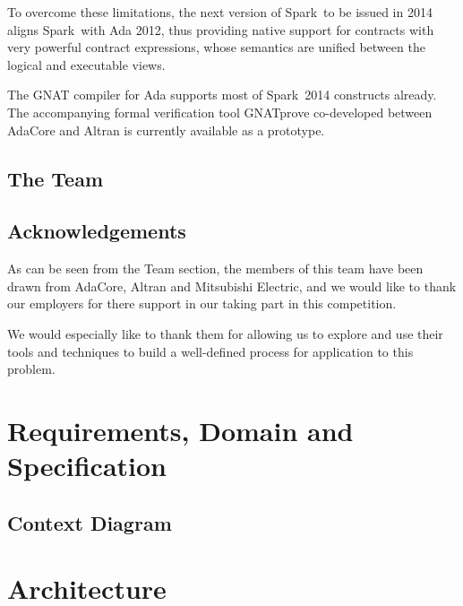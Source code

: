 \documentclass{report}
\newcommand{\spark}[0]{{\sc Spark}}
\begin{document}
To overcome these limitations, the next version of \spark\ to be
issued in 2014 aligns \spark\ with Ada 2012, thus providing native
support for contracts with very powerful contract expressions, whose
semantics are unified between the logical and executable views.

The GNAT compiler for Ada supports most of \spark\ 2014 constructs
already.  The accompanying formal verification tool GNATprove
co-developed between AdaCore and Altran is currently available as a
prototype.

\section{The Team}


\section{Acknowledgements}
As can be seen from the Team section, the members of this team have
been drawn from AdaCore, Altran and Mitsubishi Electric, and we would
like to thank our employers for there support in our taking part in
this competition.

We would especially like to thank them for allowing us to explore and
use their tools and techniques to build a well-defined process for
application to this problem.




\chapter{Requirements, Domain and Specification}
\section{Context Diagram}

\begin{center}
\end{center}





\chapter{Architecture}


\end{document}
